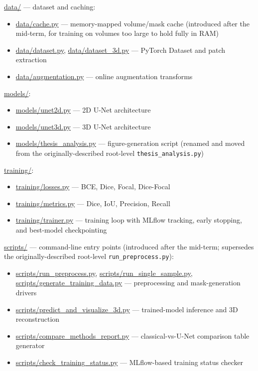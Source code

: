 \url{data/} --- dataset and caching:
\begin{itemize}
\item \url{data/cache.py} --- memory-mapped volume/mask cache (introduced after the mid-term, for
  training on volumes too large to hold fully in RAM)
\item \url{data/dataset.py}, \url{data/dataset_3d.py} --- PyTorch Dataset and patch
  extraction
\item \url{data/augmentation.py} --- online augmentation transforms
\end{itemize}

\url{models/}:
\begin{itemize}
\item \url{models/unet2d.py} --- 2D U-Net architecture
\item \url{models/unet3d.py} --- 3D U-Net architecture
\item \url{models/thesis_analysis.py} --- figure-generation script (renamed and moved from the
  originally-described root-level \texttt{thesis\_analysis.py})
\end{itemize}

\url{training/}:
\begin{itemize}
\item \url{training/losses.py} --- BCE, Dice, Focal, Dice-Focal
\item \url{training/metrics.py} --- Dice, IoU, Precision, Recall
\item \url{training/trainer.py} --- training loop with MLflow tracking, early stopping, and
  best-model checkpointing
\end{itemize}

\url{scripts/} --- command-line entry points (introduced after the mid-term; supersedes the
originally-described root-level \texttt{run\_preprocess.py}):
\begin{itemize}
\item \url{scripts/run_preprocess.py}, \url{scripts/run_single_sample.py},
  \url{scripts/generate_training_data.py} --- preprocessing and mask-generation drivers
\item \url{scripts/predict_and_visualize_3d.py} --- trained-model inference and 3D
  reconstruction
\item \url{scripts/compare_methods_report.py} --- classical-vs-U-Net comparison table generator
\item \url{scripts/check_training_status.py} --- MLflow-based training status checker
\end{itemize}

